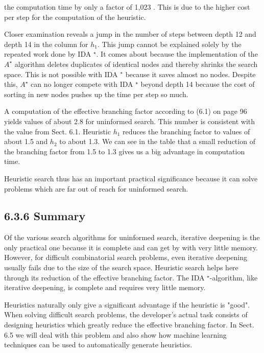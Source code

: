 \documentclass[10pt]{article}
\begin{document}
the computation time by only a factor of 1,023 . This is due to the higher cost per step for the computation of the heuristic.


Closer examination reveals a jump in the number of steps between depth 12 and depth 14 in the column for $h_{1}$. This jump cannot be explained solely by the repeated work done by IDA ${ }^{\star}$. It comes about because the implementation of the $A^{\star}$ algorithm deletes duplicates of identical nodes and thereby shrinks the search space. This is not possible with IDA ${ }^{\star}$ because it saves almost no nodes. Despite this, $A^{\star}$ can no longer compete with IDA ${ }^{\star}$ beyond depth 14 because the cost of sorting in new nodes pushes up the time per step so much.

A computation of the effective branching factor according to (6.1) on page 96 yields values of about 2.8 for uninformed search. This number is consistent with the value from Sect. 6.1. Heuristic $h_{1}$ reduces the branching factor to values of about 1.5 and $h_{2}$ to about 1.3. We can see in the table that a small reduction of the branching factor from 1.5 to 1.3 gives us a big advantage in computation time.

Heuristic search thus has an important practical significance because it can solve problems which are far out of reach for uninformed search.

\subsection*{6.3.6 Summary}
Of the various search algorithms for uninformed search, iterative deepening is the only practical one because it is complete and can get by with very little memory. However, for difficult combinatorial search problems, even iterative deepening usually fails due to the size of the search space. Heuristic search helps here through its reduction of the effective branching factor. The IDA ${ }^{\star}$-algorithm, like iterative deepening, is complete and requires very little memory.

Heuristics naturally only give a significant advantage if the heuristic is "good". When solving difficult search problems, the developer's actual task consists of designing heuristics which greatly reduce the effective branching factor. In Sect. 6.5 we will deal with this problem and also show how machine learning techniques can be used to automatically generate heuristics.
\end{document}
